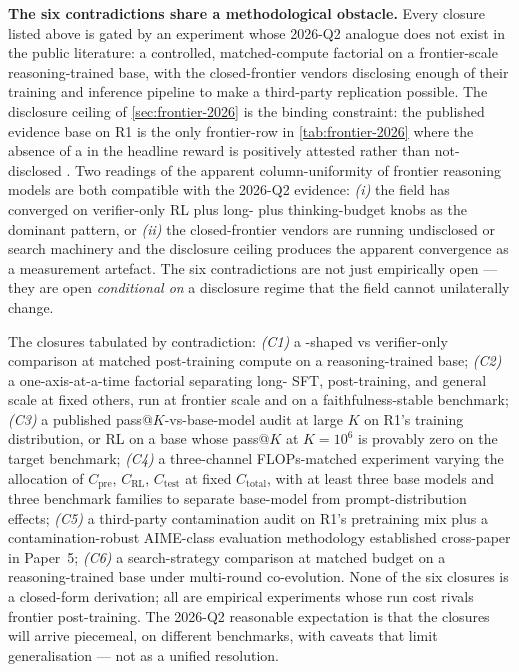 \begin{contradiction}
\textbf{The six contradictions share a methodological obstacle.}
Every closure listed above is gated by an experiment whose 2026-Q2
analogue does not exist in the public literature: a controlled,
matched-compute factorial on a frontier-scale reasoning-trained base,
with the closed-frontier vendors disclosing enough of their training
and inference pipeline to make a third-party replication possible.
The disclosure ceiling of \cref{sec:frontier-2026} is the binding
constraint: the published evidence base on R1 is the only frontier-row
in \cref{tab:frontier-2026} where the absence of a  in the
headline reward is positively attested rather than not-disclosed
\citep[\S 2.2]{deepseek-r1}. Two readings of the apparent
column-uniformity of frontier reasoning models are both compatible
with the 2026-Q2 evidence: \emph{(i)} the field has converged on
verifier-only RL plus long- plus thinking-budget knobs as the
dominant pattern, or \emph{(ii)} the closed-frontier vendors are
running undisclosed  or search machinery and the disclosure ceiling
produces the apparent convergence as a measurement artefact. The
six contradictions are not just empirically open --- they are open
\emph{conditional on} a disclosure regime that the field cannot
unilaterally change.
\end{contradiction}

The closures tabulated by contradiction:
\emph{(C1)} a -shaped  vs verifier-only  comparison at
matched post-training compute on a reasoning-trained base;
\emph{(C2)} a one-axis-at-a-time factorial separating long- SFT,
 post-training, and general scale at fixed others, run at frontier
scale and on a faithfulness-stable benchmark;
\emph{(C3)} a published pass@$K$-vs-base-model audit at large $K$ on
R1's training distribution, or RL on a base whose pass@$K$ at $K = 10^{6}$
is provably zero on the target benchmark;
\emph{(C4)} a three-channel FLOPs-matched experiment varying the
allocation of $C_\text{pre}$, $C_\text{RL}$, $C_\text{test}$ at fixed
$C_\text{total}$, with at least three base models and three benchmark
families to separate base-model from prompt-distribution effects;
\emph{(C5)} a third-party contamination audit on R1's pretraining mix
plus a contamination-robust AIME-class evaluation methodology
established cross-paper in Paper~5;
\emph{(C6)} a search-strategy comparison at matched budget on a
reasoning-trained base under multi-round co-evolution.
None of the six closures is a closed-form derivation; all are
empirical experiments whose run cost rivals frontier post-training.
The 2026-Q2 reasonable expectation is that the closures will arrive
piecemeal, on different benchmarks, with caveats that limit
generalisation --- not as a unified resolution.

